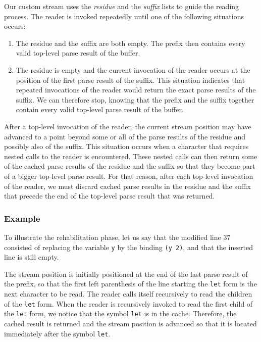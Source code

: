 Our custom stream uses the \emph{residue} and the \emph{suffix} lists
to guide the reading process.  The reader is invoked repeatedly until
one of the following situations occurs:

\begin{enumerate}
\item The residue and the suffix are both empty.  The prefix then
  contains every valid top-level parse result of the buffer.
\item The residue is empty and the current invocation of the reader
  occurs at the position of the first parse result of the suffix.
  This situation indicates that repeated invocations of the reader
  would return the exact parse results of the suffix.  We can
  therefore stop, knowing that the prefix and the suffix together
  contain every valid top-level parse result of the buffer.
\end{enumerate}

After a top-level invocation of the reader, the current stream
position may have advanced to a point beyond some or all of the parse
results of the residue and possibly also of the suffix.  This
situation occurs when a character that requires nested calls to the
reader is encountered.  These nested calls can then return some of the
cached parse results of the residue and the suffix so that they become
part of a bigger top-level parse result.  For that reason, after each
top-level invocation of the reader, we must discard cached parse
results in the residue and the suffix that precede the end of the
top-level parse result that was returned.

\subsubsection{Example}

To illustrate the rehabilitation phase, let us say that the modified
line $37$ consisted of replacing the variable \texttt{y} by the
binding \texttt{(y 2)}, and that the inserted line is still empty.

The stream position is initially positioned at the end of the last
parse result of the prefix, so that the first left parenthesis of the
line starting the \texttt{let} form is the next character to be read.
The reader calls itself recursively to read the children of the
\texttt{let} form.  When the reader is recursively invoked to read the
first child of the \texttt{let} form, we notice that the symbol
\texttt{let} is in the cache.  Therefore, the cached result is
returned and the stream position is advanced so that it is located
immediately after the symbol \texttt{let}.

